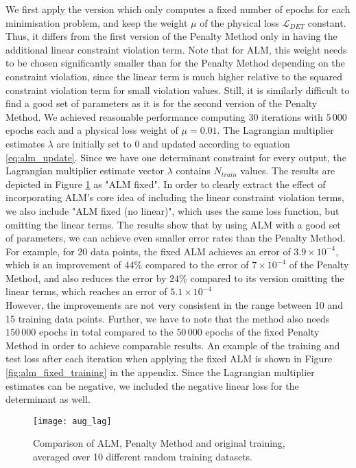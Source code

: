 We first apply the version which only computes a fixed number of epochs for each minimisation problem, and keep the weight $\mu$ of the physical loss $\mathcal{L}_{DET}$ constant. Thus, it differs from the first version of the Penalty Method only in having the additional linear constraint violation term. Note that for ALM, this weight needs to be chosen significantly smaller than for the Penalty Method depending on the constraint violation, since the linear term is much higher relative to the squared constraint violation term for small violation values. Still, it is similarly difficult to find a good set of parameters as it is for the second version of the Penalty Method. We achieved reasonable performance computing 30 iterations with $5\,000$ epochs each and a physical loss weight of $\mu = 0.01$. The Lagrangian multiplier estimates $\lambda$ are initially set to $0$ and updated according to equation \eqref{eq:alm_update}. Since we have one determinant constraint for every output, the Lagrangian multiplier estimate vector $\lambda$ contains $N_{train}$ values. The results are depicted in Figure \ref{fig:aug_lag} as "ALM fixed". In order to clearly extract the effect of incorporating ALM's core idea of including the linear constraint violation terms, we also include "ALM fixed (no linear)", which uses the same loss function, but omitting the linear terms. The results show that by using ALM with a good set of parameters, we can achieve even smaller error rates than the Penalty Method. For example, for 20 data points, the fixed ALM achieves an error of $3.9 \times 10^{-4}$, which is an improvement of $44\%$ compared to the error of $7 \times 10^{-4}$ of the Penalty Method, and also reduces the error by $24\%$ compared to its version omitting the linear terms, which reaches an error of $5.1 \times 10^{-4} $\\
\indent However, the improvements are not very consistent in the range between 10 and 15 training data points. Further, we have to note that the method also needs $150\,000$ epochs in total compared to the $50\,000$ epochs of the fixed Penalty Method in order to achieve comparable results. An example of the training and test loss after each iteration when applying the fixed ALM is shown in Figure \ref{fig:alm_fixed_training} in the appendix. Since the Lagrangian multiplier estimates can be negative, we included the negative linear loss for the determinant as well.
\begin{figure}[]
	\centering
	\texttt{[image: aug\_lag]}
	\caption{Comparison of ALM, Penalty Method and original training, averaged over 10 different random training datasets.}
	\label{fig:aug_lag}
\end{figure}
